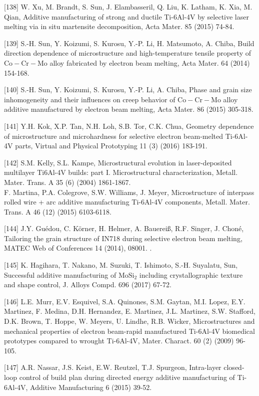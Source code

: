 \documentclass[10pt]{article}
\begin{document}
[138] W. Xu, M. Brandt, S. Sun, J. Elambasseril, Q. Liu, K. Latham, K. Xia, M. Qian, Additive manufacturing of strong and ductile Ti-6Al-4V by selective laser melting via in situ martensite decomposition, Acta Mater. 85 (2015) 74-84.

[139] S.-H. Sun, Y. Koizumi, S. Kurosu, Y.-P. Li, H. Matsumoto, A. Chiba, Build direction dependence of microstructure and high-temperature tensile property of $\mathrm{Co}-\mathrm{Cr}-\mathrm{Mo}$ alloy fabricated by electron beam melting, Acta Mater. 64 (2014) 154-168.

[140] S.-H. Sun, Y. Koizumi, S. Kurosu, Y.-P. Li, A. Chiba, Phase and grain size inhomogeneity and their influences on creep behavior of $\mathrm{Co}-\mathrm{Cr}-\mathrm{Mo}$ alloy additive manufactured by electron beam melting, Acta Mater. 86 (2015) 305-318.

[141] Y.H. Kok, X.P. Tan, N.H. Loh, S.B. Tor, C.K. Chua, Geometry dependence of microstructure and microhardness for selective electron beam-melted Ti-6Al-4V parts, Virtual and Physical Prototyping 11 (3) (2016) 183-191.

[142] S.M. Kelly, S.L. Kampe, Microstructural evolution in laser-deposited multilayer Ti6Al-4V builds: part I. Microstructural characterization, Metall. Mater. Trans. A 35 (6) (2004) 1861-1867.\\
[143] F. Martina, P.A. Colegrove, S.W. Williams, J. Meyer, Microstructure of interpass rolled wire + arc additive manufacturing Ti-6Al-4V components, Metall. Mater. Trans. A 46 (12) (2015) 6103-6118.

[144] J.Y. Guédou, C. Körner, H. Helmer, A. Bauereiß, R.F. Singer, J. Choné, Tailoring the grain structure of IN718 during selective electron beam melting, MATEC Web of Conferences 14 (2014), 08001. .

[145] K. Hagihara, T. Nakano, M. Suzuki, T. Ishimoto, S.-H. Suyalatu, Sun, Successful additive manufacturing of $\mathrm{MoSi}_{2}$ including crystallographic texture and shape control, J. Alloys Compd. 696 (2017) 67-72.

[146] L.E. Murr, E.V. Esquivel, S.A. Quinones, S.M. Gaytan, M.I. Lopez, E.Y. Martinez, F. Medina, D.H. Hernandez, E. Martinez, J.L. Martinez, S.W. Stafford, D.K. Brown, T. Hoppe, W. Meyers, U. Lindhe, R.B. Wicker, Microstructures and mechanical properties of electron beam-rapid manufactured Ti-6Al-4V biomedical prototypes compared to wrought Ti-6Al-4V, Mater. Charact. 60 (2) (2009) 96-105.

[147] A.R. Nassar, J.S. Keist, E.W. Reutzel, T.J. Spurgeon, Intra-layer closed-loop control of build plan during directed energy additive manufacturing of Ti-6Al-4V, Additive Manufacturing 6 (2015) 39-52.
\end{document}
